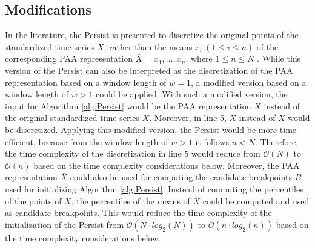 \subsection*{Modifications}
In the literature, the Persist is presented to discretize the original points of the standardized time series $X$, rather than the means $\overline{x}_i \ (1 \leq i \leq n)$ of the corresponding \ac{PAA} representation $\overline{X} = \overline{x}_1, ..., \overline{x}_n$, where $1 \leq n \leq N$ \cite{Persist}. While this version of the Persist can also be interpreted as the discretization of the \ac{PAA} representation based on a window length of $w = 1$, a modified version based on a window length of $w > 1$ could be applied. \newline
With such a modified version, the input for Algorithm \ref{alg:Persist} would be the \ac{PAA} representation $\overline{X}$ instead of the original standardized time series $X$. Moreover, in line 5, $\overline{X}$ instead of $X$ would be discretized. Applying this modified version, the Persist would be more time-efficient, because from the window length of $w > 1$ it follows $n < N$. Therefore, the time complexity of the discretization in line 5 would reduce from $\mathcal{O}(N)$ to $\mathcal{O}(n)$ based on the time complexity considerations below. \newline
Moreover, the \ac{PAA} representation $\overline{X}$ could also be used for computing the candidate breakpoints $B$ used for initializing Algorithm \ref{alg:Persist}. Instead of computing the percentiles of the points of $X$, the percentiles of the means of $\overline{X}$ could be computed and used as candidate breakpoints. This would reduce the time complexity of the initialization of the Persist from $\mathcal{O}(N \cdot log_{2}(N))$ to $\mathcal{O}(n \cdot log_{2}(n))$ based on the time complexity considerations below.
